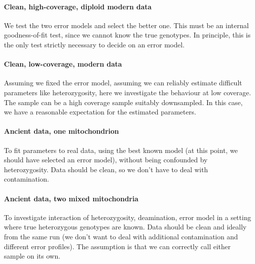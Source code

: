 \documentclass{article}
\begin{document}
\paragraph{Clean, high-coverage, diploid modern data}

We test the two error models and select the better one.  This must be an
internal goodness-of-fit test, since we cannot know the true genotypes.
In principle, this is the only test strictly necessary to decide on an
error model.


\paragraph{Clean, low-coverage, modern data}

Assuming we fixed the error model, assuming we can reliably estimate
difficult parameters like heterozygosity, here we investigate the
behaviour at low coverage.  The sample can be a high coverage sample
suitably downsampled.  In this case, we have a reasonable expectation
for the estimated parameters.

\paragraph{Ancient data, one mitochondrion}

To fit parameters to real data, using the best known model (at this
point, we should have selected an error model), without being confounded
by heterozygosity.  Data should be clean, so we don't have to deal with
contamination.


\paragraph{Ancient data, two mixed mitochondria}

To investigate interaction of heterozygosity, deamination, error model
in a setting where true heterozygous genotypes are known.  Data should
be clean and ideally from the same run (we don't want to deal with
additional contamination and different error profiles).  The assumption
is that we can correctly call either sample on its own.
\end{document}
